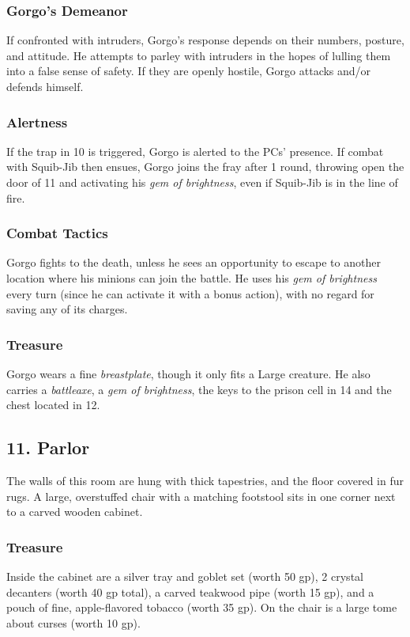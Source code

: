\documentclass[10pt,a4paper,twoside,bg=print,twocolumn,openany,nodeprecatedcode]{dndbook}
\begin{document}
\subsubsection{Gorgo's Demeanor}
 If confronted with intruders, Gorgo's response depends on their numbers, posture, and attitude. He attempts to parley with intruders in the hopes of lulling them into a false sense of safety. If they are openly hostile, Gorgo attacks and/or defends himself.

\subsubsection{Alertness}
If the trap in 10 is triggered, Gorgo is alerted to the PCs' presence. If combat with Squib-Jib then ensues, Gorgo joins the fray after 1 round, throwing open the door of 11 and activating his \textit{gem of brightness}, even if Squib-Jib is in the line of fire.

\subsubsection{Combat Tactics}
Gorgo fights to the death, unless he sees an opportunity to escape to another location where his minions can join the battle. He uses his \textit{gem of brightness} every turn (since he can activate it with a bonus action), with no regard for saving any of its charges.

\subsubsection{Treasure}
Gorgo wears a fine \textit{breastplate}, though it only fits a Large creature. He also carries a \textit{battleaxe}, a \textit{gem of brightness}, the keys to the prison cell in 14 and the chest located in 12.

\subsection{11. Parlor}
\begin{DndReadAloud}{}
The walls of this room are hung with thick tapestries, and the floor covered in fur rugs. A large, overstuffed chair with a matching footstool sits in one corner next to a carved wooden cabinet.

\end{DndReadAloud}

\subsubsection{Treasure}
Inside the cabinet are a silver tray and goblet set (worth 50 gp), 2 crystal decanters (worth 40 gp total), a carved teakwood pipe (worth 15 gp), and a pouch of fine, apple-flavored tobacco (worth 35 gp). On the chair is a large tome about curses (worth 10 gp).
\end{document}
